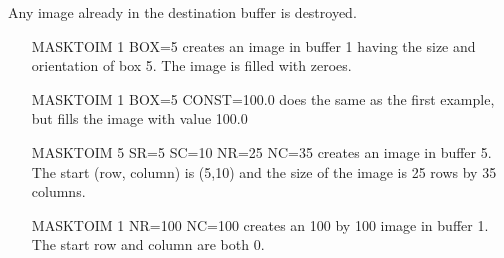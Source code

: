 Any image already in the destination buffer is destroyed.

\begin{itemize}
  \item[MASKTOIM 1 BOX=5\hfill]{creates an image in buffer 1 having the
       size and orientation of box 5.  The image is filled with zeroes.}

  \item[MASKTOIM 1 BOX=5 CONST=100.0\hfill]{does the same as the first
       example, but fills the image with value 100.0}

  \item[MASKTOIM 5 SR=5 SC=10 NR=25 NC=35\hfill]{creates an image in buffer
       5.  The start (row, column) is (5,10) and the size of the image is
       25 rows by 35 columns.}

  \item[MASKTOIM 1 NR=100 NC=100\hfill]{creates an 100 by 100 image in
       buffer 1.  The start row and column are both 0.}
\end{itemize}
